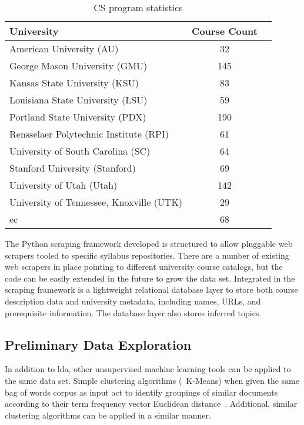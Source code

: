 
\begin{table}
  \centering
  \begin{tabular}{lcl}
    \toprule
    University & Course Count \\
    \midrule
    American University (AU) & 32 \\
    George Mason University (GMU) & 145 \\
    Kansas State University (KSU) & 83 \\
    Louisiana State University (LSU) & 59 \\
    Portland State University (PDX) & 190 \\
    Rensselaer Polytechnic Institute (RPI) & 61 \\
    University of South Carolina (SC) & 64 \\
    Stanford University (Stanford) & 69 \\
    University of Utah (Utah) & 142 \\
    University of Tennessee, Knoxville (UTK) & 29 \\
    \midrule
    \ac{ec} & 68 \\
    \bottomrule
  \end{tabular}
  \caption{CS program statistics\label{tbl:dataset}}
\end{table}


The Python scraping framework developed is structured to allow pluggable web scrapers tooled to specific syllabus repositories.
There are a number of existing web scrapers in place pointing to different university course catalogs, but the code can be easily extended in the future to grow the data set.
Integrated in the scraping framework is a lightweight relational database layer to store both course description data and university metadata, including names, URLs, and prerequisite information.
The database layer also stores inferred topics.


\subsection{Preliminary Data Exploration}
\label{sec:data-exploration}


In addition to \ac{lda}, other unsupervised machine learning tools can be applied to the same data set.
Simple clustering algorithms (\eg\ K-Means) when given the same bag of words corpus as input act to identify groupings of similar documents according to their term frequency vector Euclidean distance~\cite{lloyd1982}.
Additional, similar clustering algorithms can be applied in a similar manner.

